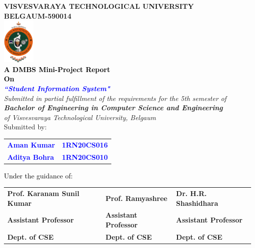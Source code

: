 
\begin{titlepage}
\begin{center}
\break\break
\textup{\large {\textcolor{darkbrown}{\bf VISVESVARAYA TECHNOLOGICAL UNIVERSITY} \\ {\textcolor{darkbrown}{\bf BELGAUM-590014}}}}\\
\includegraphics[width=0.12\textwidth]{./VTU.png}\\
\textup{\small {\textcolor{black}{\textbf {A DMBS Mini-Project Report} \\ {\textbf {On}}}}} \\
\textup{\large {\textcolor{blue}{\textbf {\textit {``Student Information System"}}}}} \\[0.2in]
\textup{{\textit {Submitted in partial fulfillment of the requirements for the 5th semester of} \\ {\textbf {\textit {Bachelor of Engineering in Computer Science and Engineering}} \\ \textit {of Visvesvaraya Technological University, Belgaum}}}}\\
\textup{Submitted by:} 
\break\break
\begin{tabular}{l  l}
\textcolor{blue}{\textbf{Aman Kumar}} & \textcolor{blue}{\hspace{2.7cm}\textbf{1RN20CS016}}\\
\textcolor{blue}{\textbf{Aditya Bohra}} & \textcolor{blue}{\hspace{2.7cm}\textbf{1RN20CS010}}\\
\end{tabular}
\break\break\break\break
\textup{\normalsize {\textcolor{black}{ Under the guidance of:}}}\break\break
\begin{tabular}{l  l  l}
\textbf{Prof. Karanam Sunil Kumar} & \textbf{Prof. Ramyashree} & \textbf{Dr. H.R. Shashidhara} \\
\textbf{Assistant Professor} & \textbf{Assistant Professor} & \textbf{Assistant Professor} \\
\textbf{Dept. of CSE} & \textbf{Dept. of CSE} & \textbf{Dept. of CSE}\\
\end{tabular}


\end{center}
\end{titlepage}
